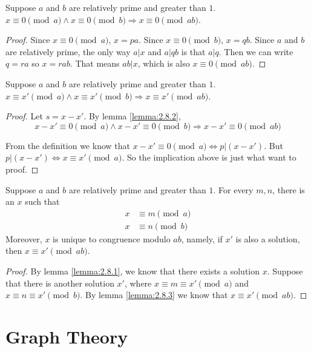 \documentclass[11pt]{article}
\begin{document}
\begin{lemma} \label{lemma:2.8.2}
Suppose $a$ and $b$ are relatively prime and greater than $1$.
$x \equiv 0 \pmod{a} \wedge x \equiv 0 \pmod{b} \Rightarrow x \equiv 0 \pmod{ab}$.
\end{lemma}

\begin{proof}
Since $x \equiv 0 \pmod{a}$, $x = pa$. Since $x \equiv 0 \pmod{b}$, $x = qb$. Since $a$ and
$b$ are relatively prime, the only way $a|x$ and $a|qb$ is that $a|q$. Then we can write
$q=ra$ so $x=rab$. That means $ab|x$, which is also $x \equiv 0 \pmod{ab}$.
\end{proof}

\begin{lemma} \label{lemma:2.8.3}
Suppose $a$ and $b$ are relatively prime and greater than $1$.
$x \equiv x' \pmod{a} \wedge x \equiv x' \pmod{b} \Rightarrow x \equiv x' \pmod{ab}$.
\end{lemma}

\begin{proof}
Let $s = x - x'$. By lemma \ref{lemma:2.8.2},
\[
x-x' \equiv 0 \pmod{a} \wedge x-x' \equiv 0 \pmod{b} \Rightarrow x-x' \equiv 0 \pmod{ab}
\]

From the definition we know that $x-x' \equiv 0 \pmod{a} \Leftrightarrow p|(x-x')$. But
$p|(x-x') \Leftrightarrow x \equiv x' \pmod{a}$. So the implication above is just what want
to proof.
\end{proof}

\begin{theorem} \label{theorem:2.8}
Suppose $a$ and $b$ are relatively prime and greater than $1$. For every $m,n$, there is an
$x$ such that
\begin{align*}
x &\equiv m \pmod{a} \\
x &\equiv n \pmod{b}
\end{align*}
Moreover, $x$ is unique to congruence modulo $ab$, namely, if $x'$ is also a solution, then
$x \equiv x' \pmod{ab}$.
\end{theorem}

\begin{proof}
By lemma \ref{lemma:2.8.1}, we know that there exists a solution $x$. Suppose that there is
another solution $x'$, where $x \equiv m \equiv x' \pmod{a}$ and $x \equiv n \equiv x'
\pmod{b}$. By lemma \ref{lemma:2.8.3} we know that $x \equiv x' \pmod{ab}$.
\end{proof}


\section{Graph Theory}
\end{document}
